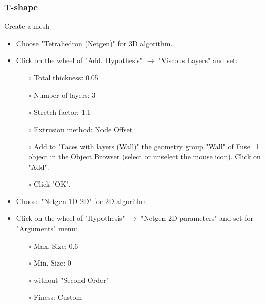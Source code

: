 \documentclass[10pt, hyperref={unicode=true,pdfusetitle, bookmarks=true,bookmarksnumbered=false,bookmarksopen=false, breaklinks=false,pdfborder={0 0 1},backref=true,colorlinks=true,linkcolor=darkblue,pageanchor}]{beamer}
\begin{document}
\begin{frame}
\frametitle{T-shape}
\begin{block}{Create a mesh}

\begin{itemize}
\item Choose "Tetrahedron (Netgen)" for 3D algorithm.
\item Click on the wheel of "Add. Hypothesis" $\rightarrow$ "Viscous Layers" and set:
    \begin{itemize}
    \item [$\circ$] Total thickness: 0.05
    \item [$\circ$] Number of layers: 3
    \item [$\circ$] Stretch factor: 1.1
    \item [$\circ$] Extrusion method: Node Offset
    \item [$\circ$] Add to "Faces with layers (Wall)" the geometry group "Wall" of Fuse\_1 object in the Object Browser (select or unselect the mouse icon). Click on "Add".
    \item [$\circ$] Click "OK".
    \end{itemize}
\item Choose "Netgen 1D-2D" for 2D algorithm.
\item Click on the wheel of "Hypothesis" $\rightarrow$ "Netgen 2D parameters" and set for "Arguments" menu:
    \begin{itemize}
    \item [$\circ$] Max. Size: 0.6
    \item [$\circ$] Min. Size: 0
    \item [$\circ$] without "Second Order"
    \item [$\circ$] Finess: Custom
    \end{itemize}

\end{itemize}

\end{block}
\end{frame}
\end{document}
